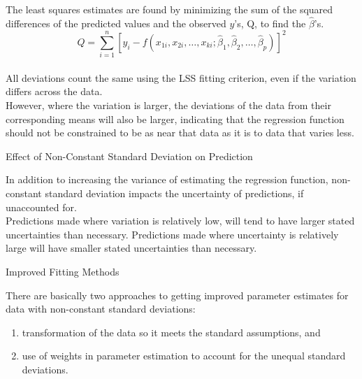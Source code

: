 {{\vspace{0.5in}
The least squares estimates are found by minimizing
the sum of the squared differences of the predicted values and the observed $y$'s, Q,
to find the $\hat{\beta}$'s.
\vspace{0.35in}
\[
Q=\sum_{i=1}^{n}[y_i-f(x_{1i},x_{2i},\ldots,x_{ki};\hat{\beta}_1,\hat{\beta}_2,\ldots,\hat{\beta}_p)]^2
\] \\
\vspace{0.5in}
All deviations count the same using the LSS fitting criterion, even if the variation
differs across the data. \\
\vspace{0.5in}
However, where the variation is larger, the deviations of the data from their corresponding
means will also be larger, indicating that the regression function should not be constrained
to be as near that data as it is to data that varies less.
\newpage
\begin{center}
Effect of Non-Constant Standard Deviation on Prediction
\end{center}
\vspace{0.75in}
In addition to increasing the variance of estimating the regression
function, non-constant standard deviation impacts the uncertainty of
predictions, if unaccounted for. \\
\vspace{0.5in}
Predictions made where variation is relatively low, will tend to have larger 
stated uncertainties than necessary. Predictions made where uncertainty is 
relatively large will have smaller stated uncertainties than necessary.
\begin{figure}
\end{figure}
\newpage
\begin{center}
Improved Fitting Methods
\end{center}
\vspace{0.75in}
There are basically two approaches to getting improved parameter
estimates for data with non-constant standard deviations:
\vspace{0.5in}
\begin{enumerate}
\item transformation of the data so it meets the standard assumptions, and
\vspace{0.15in}
\item use of weights in parameter estimation to account for the unequal 
standard deviations.
\end{enumerate}
}}
